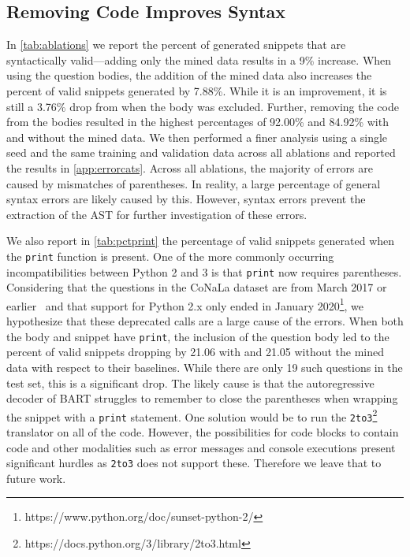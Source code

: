 \documentclass[11pt]{article}
\newcommand{\codesnip}[1]{\small\texttt{#1}\normalsize}
\begin{document}
\subsection{Removing Code Improves Syntax}\label{subsec:quality}

In \autoref{tab:ablations} we report the percent of generated snippets that are syntactically valid—adding only the mined data results in a 9\% increase. When using the question bodies, the addition of the mined data also increases the percent of valid snippets generated by 7.88\%. While it is an improvement, it is still a 3.76\% drop from when the body was excluded. Further, removing the code from the bodies resulted in the highest percentages of 92.00\% and 84.92\% with and without the mined data. We then performed a finer analysis using a single seed and the same training and validation data across all ablations and reported the results in \autoref{app:errorcats}. Across all ablations, the majority of errors are caused by mismatches of parentheses. In reality, a large percentage of general syntax errors are likely caused by this. However, syntax errors prevent the extraction of the AST for further investigation of these errors.

\indent We also report in \autoref{tab:pctprint} the percentage of valid snippets generated when the \codesnip{print} function is present. One of the more commonly occurring incompatibilities between Python 2 and 3 is that \codesnip{print} now requires parentheses. Considering that the questions in the CoNaLa dataset are from March 2017 or earlier~\citep{yin2018learning} and that support for Python 2.x only ended in January 2020\footnote{https://www.python.org/doc/sunset-python-2/}, we hypothesize that these deprecated calls are a large cause of the errors. When both the body and snippet have \codesnip{print}, the inclusion of the question body led to the percent of valid snippets dropping by 21.06 with and 21.05 without the mined data with respect to their baselines. While there are only 19 such questions in the test set, this is a significant drop. The likely cause is that the autoregressive decoder of BART struggles to remember to close the parentheses when wrapping the snippet with a \codesnip{print} statement. One solution would be to run the \codesnip{2to3}\footnote{https://docs.python.org/3/library/2to3.html} translator on all of the code. However, the possibilities for code blocks to contain code and other modalities such as error messages and console executions present significant hurdles as \codesnip{2to3} does not support these. Therefore we leave that to future work.
\end{document}
